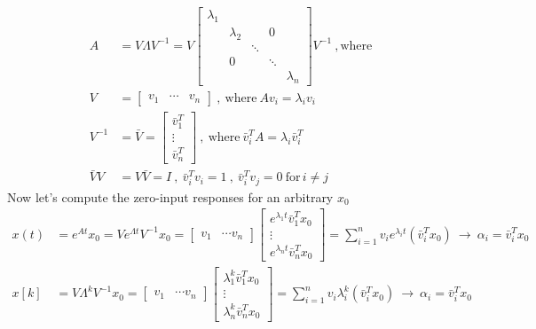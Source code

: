 \documentclass[twoside]{article}
\begin{document}
\begin{align*}
	A &= V \Lambda V^{-1} = V \left[ \begin{array}{ccccc} \lambda_1 &  & & &  \\  & \lambda_2  &  & 0 &  \\ &  & \ddots & \\ & 0 & & \ddots & \\ & &  & &  \lambda_n \end{array} \right] V^{-1} \ , \mathrm{where}
	\\
	 V &= \left[ \begin{array}{ccc} v_1 & \cdots & v_n \end{array} \right] \ , \ \mathrm{where} \ A v_i = \lambda_i v_i 
 \\
 V^{-1} &= \bar{V} =  \left[ \begin{array}{c} \bar{v}_1^T \\ \vdots \\ \bar{v}_n^T \end{array} \right] \ , \ \mathrm{where} \ \bar{v}_i^T A = \lambda_i \bar{v}_i^T
  \\
\bar{V} V &= V \bar{V} = I \ , \ \bar{v}_i^T v_i = 1 \ , \  \bar{v}_i^T v_j = 0 \ \mathrm{for} \, i \neq j
\end{align*}
%
Now let's compute the zero-input responses for an arbitrary $x_0$
%
%
\begin{align*}
	x(t) &= e^{A t} x_0 = V e^{\Lambda t} V^{-1} x_0 = \left[ \begin{array}{ccc} v_1 & \cdots v_n \end{array} \right] 
	\left[ \begin{array}{c} e^{\lambda_1 t} \bar{v}_1^T x_0 \\  \vdots \\ e^{\lambda_n t} \bar{v}_n^T x_0 \end{array} \right] 
	= \sum\limits_{i=1}^n v_i e^{\lambda_i t} \left( \bar{v}_i^T x_0 \right) \ \rightarrow \ \alpha_i = \bar{v}_i^T x_0
       \\
	x[k] &= V \Lambda^k V^{-1} x_0 = \left[ \begin{array}{ccc} v_1 & \cdots v_n \end{array} \right] 
	\left[ \begin{array}{c} \lambda_1^k \bar{v}_1^T x_0 \\  \vdots \\ \lambda_n^k \bar{v}_n^T x_0 \end{array} \right] 
	= \sum\limits_{i=1}^n v_i \lambda_i^k \left( \bar{v}_i^T x_0 \right) \ \rightarrow \ \alpha_i = \bar{v}_i^T x_0
\end{align*}
\end{document}
